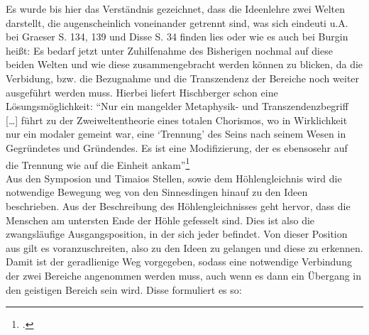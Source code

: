 Es wurde bis hier das Verständnis gezeichnet, dass die Ideenlehre zwei Welten darstellt, die augenscheinlich voneinander getrennt sind, was sich eindeuti u.A. bei Graeser S. 134, 139 und Disse S. 34 finden lies oder wie es auch bei Burgin heißt: 
Es bedarf jetzt unter Zuhilfenahme des Bisherigen nochmal auf diese beiden Welten und wie diese zusammengebracht werden können zu blicken, da die Verbidung, bzw. die Bezugnahme und die Transzendenz der Bereiche noch weiter ausgeführt werden muss.
Hierbei liefert Hischberger schon eine Lösungsmöglichkeit:
\enquote{Nur ein mangelder Metaphysik- und Transzendenzbegriff [\dots] führt zu der Zweiweltentheorie eines totalen Chorismos, wo in Wirklichkeit nur ein modaler gemeint war, eine \enquote{Trennung} des Seins nach seinem Wesen in Gegründetes und Gründendes. Es ist eine Modifizierung, der es ebensosehr auf die Trennung wie auf die Einheit ankam}\footcite[][S. 96]{Hirschberger}\\
Aus den Symposion und Timaios Stellen, sowie dem Höhlengleichnis wird die notwendige Bewegung weg von den Sinnesdingen hinauf zu den Ideen beschrieben. Aus der Beschreibung des Höhlengleichnisses geht hervor, dass die Menschen am untersten Ende der Höhle gefesselt sind. Dies ist also die zwangsläufige Ausgangsposition, in der sich jeder befindet. Von dieser Position aus gilt es voranzuschreiten, also zu den Ideen zu gelangen und diese zu erkennen. Damit ist der geradlienige Weg vorgegeben, sodass eine notwendige Verbindung der zwei Bereiche angenommen werden muss, auch wenn es dann ein Übergang in den geistigen Bereich sein wird. 
Disse formuliert es so:  
